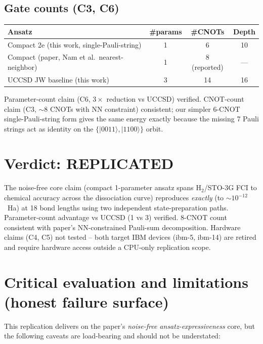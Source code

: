 \documentclass[11pt]{article}
\begin{document}
\subsection*{Gate counts (C3, C6)}
\begin{center}\small
\begin{tabular}{lccc}
\toprule
Ansatz & \#params & \#CNOTs & Depth \\
\midrule
Compact 2e (this work, single-Pauli-string) & 1 & 6 & 10 \\
Compact (paper, Nam et al.\ nearest-neighbor) & 1 & 8 (reported) & --- \\
UCCSD JW baseline (this work) & 3 & 14 & 16 \\
\bottomrule
\end{tabular}
\end{center}
Parameter-count claim (C6, $3\times$ reduction vs UCCSD) verified. CNOT-count
claim (C3, $\sim$8 CNOTs with NN constraint) consistent; our simpler 6-CNOT
single-Pauli-string form gives the same energy exactly because the missing 7
Pauli strings act as identity on the $\{|0011\rangle,|1100\rangle\}$ orbit.

\section{Verdict: REPLICATED}
The noise-free core claim (compact 1-parameter ansatz spans H$_2$/STO-3G FCI to
chemical accuracy across the dissociation curve) reproduces \emph{exactly}
(to $\sim 10^{-12}$~Ha) at 18 bond lengths using two independent state-preparation
paths. Parameter-count advantage vs UCCSD (1 vs 3) verified. 8-CNOT count
consistent with paper's NN-constrained Pauli-sum decomposition. Hardware claims
(C4, C5) not tested -- both target IBM devices (ibm-5, ibm-14) are retired and
require hardware access outside a CPU-only replication scope.

\section{Critical evaluation and limitations (honest failure surface)}
This replication delivers on the paper's \emph{noise-free ansatz-expressiveness}
core, but the following caveats are load-bearing and should not be understated:
\end{document}
